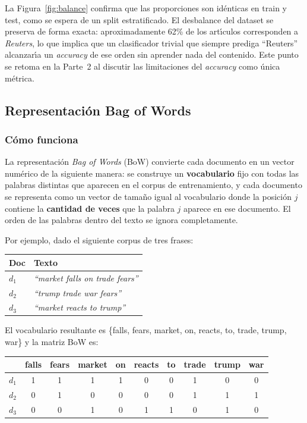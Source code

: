 \documentclass[11pt,a4paper]{article}
\begin{document}
La Figura~\ref{fig:balance} confirma que las proporciones son id\'{e}nticas en train y test, como se espera de un split estratificado. El desbalance del dataset se preserva de forma exacta: aproximadamente 62\% de los art\'{\i}culos corresponden a \textit{Reuters}, lo que implica que un clasificador trivial que siempre prediga ``Reuters'' alcanzar\'{\i}a un \textit{accuracy} de ese orden sin aprender nada del contenido. Este punto se retoma en la Parte~2 al discutir las limitaciones del \textit{accuracy} como \'{u}nica m\'{e}trica.

\subsection{Representaci\'{o}n Bag of Words}

\subsubsection*{C\'{o}mo funciona}

La representaci\'{o}n \textit{Bag of Words} (BoW) convierte cada documento en un vector num\'{e}rico de la siguiente manera: se construye un \textbf{vocabulario} fijo con todas las palabras distintas que aparecen en el corpus de entrenamiento, y cada documento se representa como un vector de tama\~{n}o igual al vocabulario donde la posici\'{o}n $j$ contiene la \textbf{cantidad de veces} que la palabra $j$ aparece en ese documento. El orden de las palabras dentro del texto se ignora completamente.

Por ejemplo, dado el siguiente corpus de tres frases:

\begin{center}
\begin{tabular}{ll}
\toprule
\textbf{Doc} & \textbf{Texto} \\
\midrule
$d_1$ & \textit{``market falls on trade fears''} \\
$d_2$ & \textit{``trump trade war fears''} \\
$d_3$ & \textit{``market reacts to trump''} \\
\bottomrule
\end{tabular}
\end{center}

El vocabulario resultante es \{falls, fears, market, on, reacts, to, trade, trump, war\} y la matriz BoW es:

\begin{center}
\begin{tabular}{l ccccccccc}
\toprule
 & falls & fears & market & on & reacts & to & trade & trump & war \\
\midrule
$d_1$ & 1 & 1 & 1 & 1 & 0 & 0 & 1 & 0 & 0 \\
$d_2$ & 0 & 1 & 0 & 0 & 0 & 0 & 1 & 1 & 1 \\
$d_3$ & 0 & 0 & 1 & 0 & 1 & 1 & 0 & 1 & 0 \\
\bottomrule
\end{tabular}
\end{center}
\end{document}
